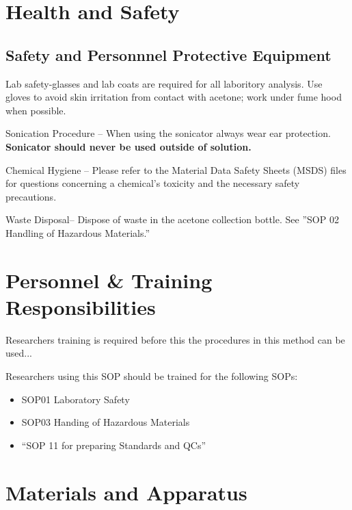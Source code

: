 \documentclass[12pt]{../SOP3_alpha}
\begin{document}
\section{Health and Safety}

\subsection*{Safety and Personnnel Protective Equipment}

\NP Lab safety-glasses and lab coats are required for all laboritory analysis. Use gloves to avoid skin irritation from contact with acetone; work under fume hood when possible. 

\NP Sonication Procedure -- When using the sonicator always wear ear protection. \textbf {Sonicator should never be used outside of solution.}

\NP Chemical Hygiene -- Please refer to the Material Data Safety Sheets (MSDS) files for questions concerning a chemical's toxicity and the necessary safety precautions.

\NP Waste Disposal-- Dispose of waste in the acetone collection bottle. See ''SOP 02 Handling of Hazardous Materials.'' %

\section{Personnel \& Training Responsibilities}

\NP Researchers training is required before this the procedures in this method can be used... 

\NP Researchers using this SOP should be trained for the following SOPs:

\begin{itemize}
  \item SOP01 Laboratory Safety
  \item SOP03 Handing of Hazardous Materials
\item ``SOP 11 for preparing Standards and QCs'' %
\end{itemize}

\section{Materials and Apparatus}
\end{document}
